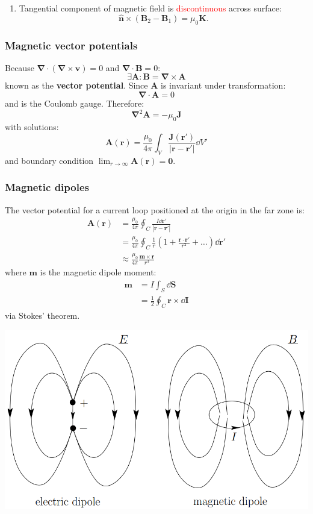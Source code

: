 \documentclass{article}
\newcommand{\vc}[1]{\boldsymbol{#1}}
\begin{document}
\begin{multicols*}{3}
\begin{enumerate}
    \item Tangential component of magnetic field
    is \textcolor{red}{discontinuous} across surface:
    $$\hat{\vc{n}}\times(\vc{B}_2-\vc{B}_1)=\mu_0\vc{K}.$$
\end{enumerate}

\subsubsection*{Magnetic vector potentials}
Because $\vc{\nabla}\cdot(\vc{\nabla}\times\vc{v})=0$
and $\vc{\nabla}\cdot\vc{B}=0$:
$$\exists\vc{A}:\vc{B}=\vc{\nabla}\times\vc{A}$$
known as the \textbf{vector potential}.
Since $\vc{A}$ is invariant under transformation:
$$\vc{\nabla}\cdot\vc{A}=0$$
and is the Coulomb gauge. Therefore:
$$\vc{\nabla}^2\vc{A}=-\mu_0\vc{J}$$
with solutions:
$$\vc{A}(\vc{r})=\frac{\mu_0}{4\pi}\int_V
\frac{\vc{J}(\vc{r}')}{|\vc{r}-\vc{r}'|}\dd V'$$
and boundary condition $\displaystyle\lim_{r\rightarrow\infty}
\vc{A}(\vc{r})=\vc{0}$.

\subsubsection*{Magnetic dipoles}
The vector potential for a current loop positioned
at the origin in the far zone is:
\begin{align*}
    \vc{A}(\vc{r})
    &=\frac{\mu_0}{4\pi}\oint_C
    \frac{I\dd\vc{r}'}{|\vc{r}-\vc{r}'|} \\
    &=\frac{\mu_0}{4\pi}\oint_C\frac{1}{r}\left(1+
    \frac{\vc{r}\cdot\vc{r}'}{r^2}+\dots\right)\dd\vc{r}' \\
    &\approx\frac{\mu_0}{4\pi}\frac{\vc{m}\times\vc{r}}{r^3}
\end{align*}
where $\vc{m}$ is the magnetic dipole moment:
\begin{align*}
    \vc{m}
    &=I\int_S\dd\vc{S} \\
    &=\frac{1}{2}\oint_C\vc{r}\times\dd\vc{I}
\end{align*}
via Stokes' theorem.
\begin{center}
    \includegraphics[scale=0.4]{f09.png}
\end{center}


\end{multicols*}
\end{document}
